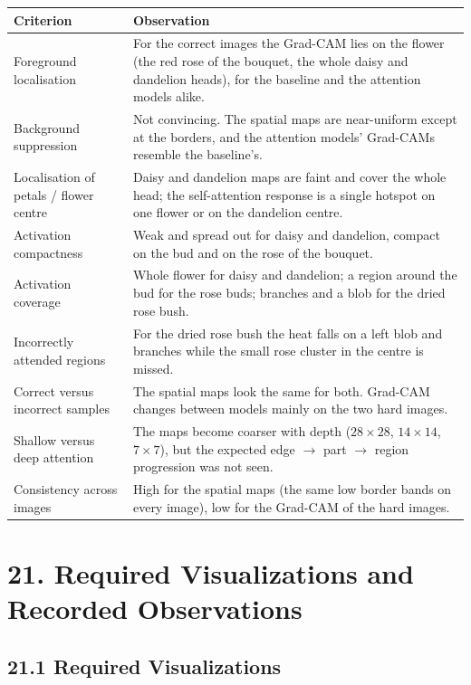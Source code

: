 \documentclass[11pt]{article}
\begin{document}
\begin{center}
\small
\begin{tabular}{|p{4.2cm}|p{11.9cm}|}
\hline
Criterion & Observation\\
\hline
Foreground localisation & For the correct images the Grad-CAM lies on the flower (the red rose of the bouquet, the whole daisy and dandelion heads), for the baseline and the attention models alike.\\
Background suppression & Not convincing. The spatial maps are near-uniform except at the borders, and the attention models' Grad-CAMs resemble the baseline's.\\
Localisation of petals / flower centre & Daisy and dandelion maps are faint and cover the whole head; the self-attention response is a single hotspot on one flower or on the dandelion centre.\\
Activation compactness & Weak and spread out for daisy and dandelion, compact on the bud and on the rose of the bouquet.\\
Activation coverage & Whole flower for daisy and dandelion; a region around the bud for the rose buds; branches and a blob for the dried rose bush.\\
Incorrectly attended regions & For the dried rose bush the heat falls on a left blob and branches while the small rose cluster in the centre is missed.\\
Correct versus incorrect samples & The spatial maps look the same for both. Grad-CAM changes between models mainly on the two hard images.\\
Shallow versus deep attention & The maps become coarser with depth ($28\times28$, $14\times14$, $7\times7$), but the expected edge $\rightarrow$ part $\rightarrow$ region progression was not seen.\\
Consistency across images & High for the spatial maps (the same low border bands on every image), low for the Grad-CAM of the hard images.\\
\hline
\end{tabular}
\end{center}

\section*{21. Required Visualizations and Recorded Observations}

\subsection*{21.1 Required Visualizations}
\end{document}
